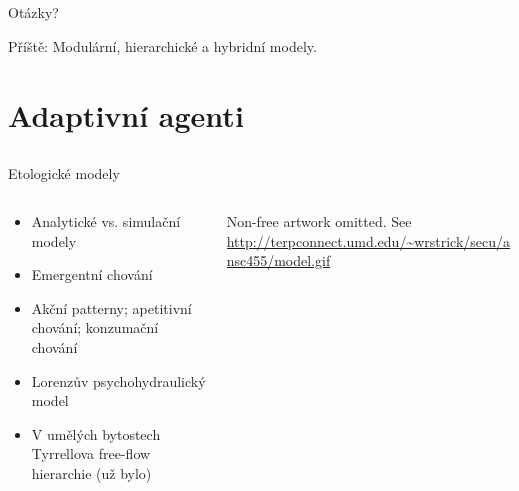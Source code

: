 \documentclass{beamer}
\begin{document}
\subsection{}
\begin{frame}{Otázky?}
\begin{center}
Příště: Modulární, hierarchické a hybridní modely.
\end{center}
\end{frame}

\section{Adaptivní agenti}

\subsection{}
\begin{frame}{Etologické modely}
\begin{columns}
\begin{column}{6cm}
\begin{itemize}
\item Analytické vs. simulační modely
\item Emergentní chování
\item Akční patterny; apetitivní chování; konzumační chování
\item Lorenzův psychohydraulický model
\item V umělých bytostech Tyrrellova free-flow hierarchie (už bylo)
\end{itemize}
\end{column}
\begin{column}{5cm}
Non-free artwork omitted. See
\url{http://terpconnect.umd.edu/~wrstrick/secu/ansc455/model.gif}
\end{column}
\end{columns}
\end{frame}
\end{document}
